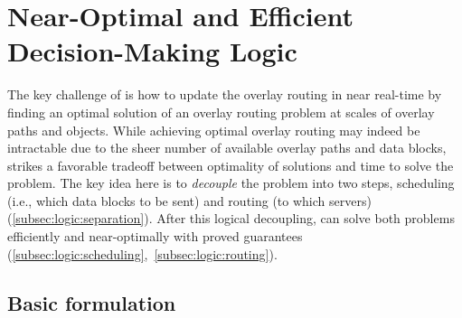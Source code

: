 \section{Near-Optimal and Efficient Decision-Making Logic}
\label{sec:logic}

The key challenge of \name is how to update the overlay routing
in near real-time by finding an optimal solution of an overlay
routing problem at scales of
\fillme overlay paths and \fillme objects.
While achieving optimal overlay routing may
indeed be intractable due to the
sheer number of available overlay paths and data blocks,
\name strikes a favorable tradeoff between optimality of solutions
and time to solve the problem.
The key idea here is to {\em decouple} the problem into two steps,
scheduling (i.e., which data blocks to be sent)
and routing (to which servers)
 (\Section\ref{subsec:logic:separation}).
After this logical decoupling, \name can solve both problems
efficiently and near-optimally with proved guarantees
(\Section\ref{subsec:logic:scheduling},~\ref{subsec:logic:routing}).



\subsection{Basic formulation}
\label{subsec:logic:formulation}

